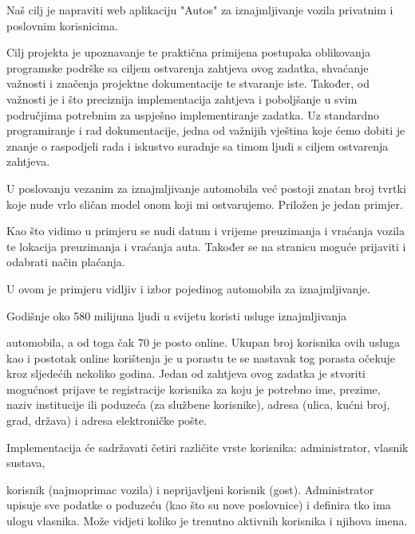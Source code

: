 		 \text Naš cilj je napraviti web aplikaciju "Autos" za iznajmljivanje vozila privatnim i poslovnim korisnicima. \par 
		 \text Cilj projekta je upoznavanje te praktična primijena postupaka oblikovanja programske podrške sa ciljem ostvarenja zahtjeva ovog zadatka, shvaćanje važnosti i značenja projektne dokumentacije te stvaranje iste. Također, od važnosti je i što preciznija implementacija zahtjeva i poboljšanje u svim područjima potrebnim za uspješno implementiranje zadatka. Uz standardno programiranje i rad dokumentacije, jedna od važnijih vještina koje ćemo dobiti je znanje o raspodjeli rada i iskustvo suradnje sa timom ljudi s ciljem ostvarenja zahtjeva. \par 
		 \text U poslovanju vezanim za iznajmljivanje automobila već postoji znatan broj tvrtki koje nude vrlo sličan model onom koji mi ostvarujemo. Priložen je jedan primjer.\par  
		 \text Kao što vidimo u primjeru se nudi datum i vrijeme preuzimanja i vraćanja vozila te lokacija preuzimanja i vraćanja auta. Također se na stranicu moguće prijaviti i odabrati način plaćanja. \par 
		 \text U ovom je primjeru vidljiv i izbor pojedinog automobila za iznajmljivanje. \par 
		 \text Godišnje oko 580 milijuna ljudi u svijetu koristi usluge iznajmljivanja\par  automobila, a od toga čak 70 je posto online. Ukupan broj korisnika ovih usluga kao i postotak online korištenja je u porastu te se nastavak tog porasta očekuje kroz sljedećih nekoliko godina. 
		 \text Jedan od zahtjeva ovog zadatka je stvoriti mogućnost prijave te registracije korisnika za koju je potrebno ime, prezime,  naziv institucije ili poduzeća (za službene korisnike), adresa (ulica, kućni broj,
grad, država) i adresa elektroničke pošte. \par 
         \text Implementacija će sadržavati četiri različite vrste korisnika: administrator, vlasnik sustava,\par 
korisnik (najmoprimac vozila) i neprijavljeni korisnik (gost).
        \text Administrator upisuje sve podatke o poduzeću (kao što su nove poslovnice) i definira tko ima ulogu vlasnika. Može vidjeti koliko je trenutno aktivnih korisnika i njihova imena.\par 
